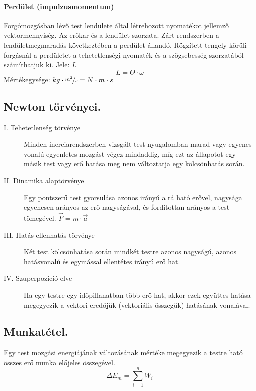 \paragraph{Perdület (impulzusmomentum)} Forgómozgásban lévő test lendülete által létrehozott nyomatékot jellemző vektormennyiség. Az erőkar és a lendület szorzata. Zárt rendszerben a lendületmegmaradás következtében a perdület állandó. Rögzített tengely körüli forgásnál a perdületet a tehetetlenségi nyomaték és a szögsebesség szorzatából számíthatjuk ki.
Jele: $L$	$$L=\Theta \cdot \omega$$
Mértékegysége: $kg\cdot \nicefrac{m^2}{s} = N \cdot m \cdot s$

\subsection{Newton törvényei.}
\begin{description}
	\item[I. Tehetetlenség törvénye] Minden inerciarendszerben vizsgált test nyugalomban marad vagy egyenes vonalú egyenletes mozgást végez mindaddig, míg ezt az állapotot egy másik test vagy erő hatása meg nem változtatja egy kölcsönhatás során.

	\item[II. Dinamika alaptörvénye] Egy pontszerű test gyorsulása azonos irányú a rá ható erővel, nagysága egyenesen arányos az erő nagyságával, és fordítottan arányos a test tömegével. $\vec{F}=m \cdot \vec{a}$

	\item[III. Hatás-ellenhatás törvénye] Két test kölcsönhatása során mindkét testre azonos nagyságú, azonos hatásvonalú és egymással ellentétes irányú erő hat.

	\item[IV. Szuperpozíció elve] Ha egy testre egy időpillanatban több erő hat, akkor ezek együttes hatása megegyezik a vektori eredőjük (vektoriális összegük) hatásának vonalával.
\end{description}

\subsection{Munkatétel.}
\begin{theorem}
	Egy test mozgási energiájának változásának mértéke megegyezik a testre ható összes erő munka előjeles összegével.
	$$\Delta E_m = \sum_{i=1}^{n}W_i$$
\end{theorem}

